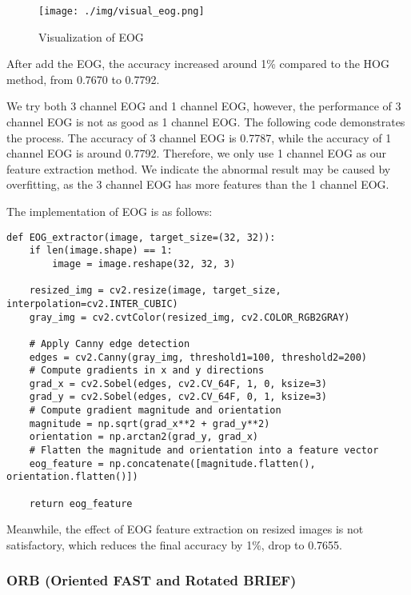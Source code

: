 \documentclass[a4paper,11pt]{article}
\begin{document}
\begin{figure}[H]
    \centering
    \texttt{[image: ./img/visual\_eog.png]}
    \caption[visual_hog] {Visualization of EOG}
\end{figure}

After add the EOG, the accuracy increased around 1\% compared to the HOG method, from 0.7670 to 0.7792.

We try both 3 channel EOG and 1 channel EOG, however, the performance of 3 channel EOG is not as good as 1 channel EOG. The following code demonstrates the process.
The accuracy of 3 channel EOG is 0.7787, while the accuracy of 1 channel EOG is around 0.7792.
Therefore, we only use 1 channel EOG as our feature extraction method. We indicate the abnormal result may be caused by overfitting, as the 3 channel EOG has more features than the 1 channel EOG.

The implementation of EOG is as follows:

\begin{verbatim}
def EOG_extractor(image, target_size=(32, 32)):
    if len(image.shape) == 1:
        image = image.reshape(32, 32, 3)
        
    resized_img = cv2.resize(image, target_size, interpolation=cv2.INTER_CUBIC)
    gray_img = cv2.cvtColor(resized_img, cv2.COLOR_RGB2GRAY)

    # Apply Canny edge detection
    edges = cv2.Canny(gray_img, threshold1=100, threshold2=200)
    # Compute gradients in x and y directions
    grad_x = cv2.Sobel(edges, cv2.CV_64F, 1, 0, ksize=3)
    grad_y = cv2.Sobel(edges, cv2.CV_64F, 0, 1, ksize=3)
    # Compute gradient magnitude and orientation
    magnitude = np.sqrt(grad_x**2 + grad_y**2)
    orientation = np.arctan2(grad_y, grad_x)
    # Flatten the magnitude and orientation into a feature vector
    eog_feature = np.concatenate([magnitude.flatten(), orientation.flatten()])

    return eog_feature
\end{verbatim}

Meanwhile, the effect of EOG feature extraction on resized images is not satisfactory, which reduces the final accuracy by 1\%, drop to 0.7655. 

\subsubsection{ORB (Oriented FAST and Rotated BRIEF)}
\end{document}

